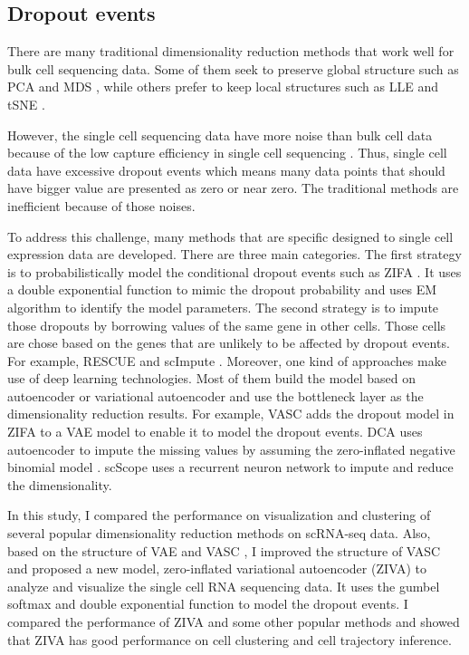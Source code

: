 \subsection{Dropout events}

There are many traditional dimensionality reduction methods that work well for bulk cell sequencing data. Some of them seek to preserve global structure such as PCA \cite{Abdi2010} and MDS \cite{Kruskal1964}, while others prefer to keep local structures such as LLE \cite{roweis2000nonlinear} and tSNE \cite{Kobak2019}.

However, the single cell sequencing data have more noise than bulk cell data because of the low capture efficiency in single cell sequencing \cite{Peng2019}. Thus, single cell data have excessive dropout events which means many data points that should have bigger value are presented as zero or near zero. The traditional methods are inefficient because of those noises.  

To address this challenge, many methods that are specific designed to single cell expression data are developed. There are three main categories. The first strategy is to probabilistically model the conditional dropout events such as ZIFA \cite{Pierson2015}. It uses a double exponential function to mimic the dropout probability and uses EM algorithm \cite{mclachlan2007algorithm} to identify the model parameters.
The second strategy is to impute those dropouts by borrowing values of the same gene in other cells. Those cells are chose based on the genes that are unlikely to be affected by dropout events. For example, RESCUE \cite{Tracy2019} and scImpute \cite{Li2018}. 
Moreover, one kind of approaches make use of deep learning technologies. Most of them build the model based on autoencoder or variational autoencoder and use the bottleneck layer as the dimensionality reduction results. For example, VASC \cite{Wang2018} adds the dropout model in ZIFA to a VAE model to enable it to model the dropout events. DCA \cite{Eraslan2019a} uses autoencoder to impute the missing values by assuming the zero-inflated negative binomial model \cite{Hafemeister2019}. scScope \cite{Deng2019} uses a recurrent neuron network to impute and reduce the dimensionality. 

In this study, I compared the performance on visualization and clustering of several popular dimensionality reduction methods on scRNA-seq data. Also, based on the structure of VAE \cite{Kingma2014} and VASC \cite{Wang2018}, I improved the structure of VASC and proposed a new model, zero-inflated variational autoencoder (ZIVA) to analyze and visualize the single cell RNA sequencing data. It uses the gumbel softmax and double exponential function to model the dropout events. I compared the performance of ZIVA and some other popular methods and showed that ZIVA has good performance on cell clustering and cell trajectory inference.

